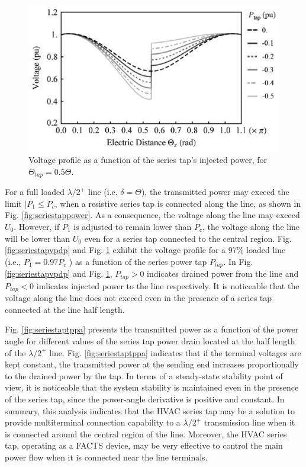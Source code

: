 \documentclass[12pt,a4paper]{reportmod}
\begin{document}
\begin{figure}[H]
\label{fig:seriestapvpip}
\begin{center}
\includegraphics[scale=0.3]{seriestapvpip.png}
\caption{Voltage profile as a function of the series tap’s injected power, for $\Theta_{tap}=0.5\Theta$.}
\end{center}
\end{figure}
\par For a full loaded $\lambda /2^+$ line (i.e. $\delta = \Theta$), the transmitted power may exceed the limit $|P_1 \leq P_c$, when a resistive series tap is connected along the line, as shown in Fig. \ref{fig:seriestappower}. As a consequence, the voltage along the line may exceed $U_0$. However, if $P_1$ is adjusted to remain lower than $P_c$, the voltage along the line will be lower than $U_0$ even for a series tap connected to the central region. Fig. \ref{fig:seriestapvpdp} and Fig. \ref{fig:seriestapvpip} exhibit the voltage profile for a 97\% loaded line (i.e., $P_1=0.97P_c$ ) as a function of the series power tap $P_{tap}$. In Fig. \ref{fig:seriestapvpdp} and Fig. \ref{fig:seriestapvpip}, $P_{tap}>0$ indicates drained power from the line and $P_{tap}<0$ indicates injected power to the line respectively. It is noticeable that the voltage along the line does not exceed even in the presence of a series tap connected at the line half length.
\par Fig. \ref{fig:seriestaptppa} presents the transmitted power as a function of the power angle for different values of the series tap power drain located at the half length of the $\lambda /2^+$ line. Fig. \ref{fig:seriestaptppa} indicates that if the terminal voltages are kept constant, the transmitted power at the sending end increases proportionally to the drained power by the tap. In terms of a steady-state stability point of view, it is noticeable that the system stability is maintained even in the presence of the series tap, since the power-angle derivative is positive and constant. In summary, this analysis indicates that the HVAC series tap may be a solution to provide multiterminal connection capability to a $\lambda /2^+$ transmission line when it is connected around the central region of the line. Moreover, the HVAC series tap, operating as a FACTS device, may be very effective to control the main power flow when it is connected near the line terminals.
\end{document}
